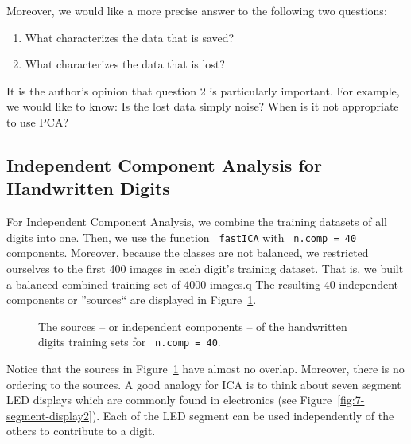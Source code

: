 \documentclass[12pt,article,oneside]{memoir}
\newcommand{\func}[1]{\texttt{\color{red} #1}}
\begin{document}
Moreover, we would like a more precise answer to the following two questions:
 \begin{enumerate}
 	\item What characterizes the data that is saved?
 	\item What characterizes the data that is lost?
 \end{enumerate}
 It is the author's opinion that question 2 is particularly important. For example, we would like to know: Is the lost data simply noise? When is it not appropriate to use PCA?



\subsection{Independent Component Analysis for Handwritten Digits}

For Independent Component Analysis, we combine the training datasets of all digits into one. Then, we use the function \func{fastICA} with \func{n.comp = 40} components. Moreover, because the classes are not balanced, we restricted ourselves to the first 400 images in each digit's training dataset. That is, we built a balanced combined training set of 4000 images.q The resulting 40 independent components or ''sources`` are displayed in Figure~\ref{fig:ica-components}.
\begin{figure}[H]
	\caption{The sources -- or independent components -- of the handwritten digits training sets for \func{n.comp = 40}.}
	\label{fig:ica-components}
\end{figure}

Notice that the sources in Figure~\ref{fig:ica-components} have almost no overlap. Moreover, there is no ordering to the sources. A good analogy for ICA is to think about seven segment LED displays which are commonly found in electronics (see Figure~\ref{fig:7-segment-display2}). Each of the LED segment can be used independently of the others to contribute to a digit.
\end{document}
